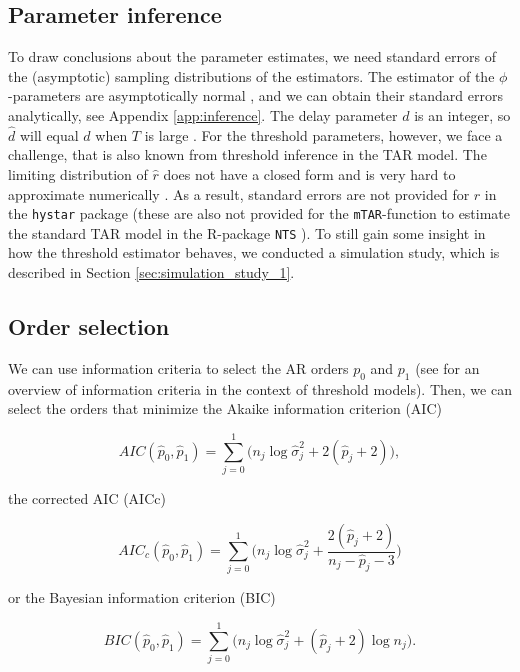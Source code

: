 \documentclass{article}
\begin{document}
\subsection{Parameter inference}
To draw conclusions about the parameter estimates, we need standard errors of the (asymptotic) sampling distributions of the estimators.
The estimator of the $\phi$-parameters are asymptotically normal \citep{bar2}, and we can obtain their standard errors analytically, see Appendix \ref{app:inference}.
The delay parameter $d$ is an integer, so $\hat{d}$ will equal $d$ when $T$ is large \citep{bar2}.
For the threshold parameters, however, we face a challenge, that is also known from threshold inference in the TAR model. 
The limiting distribution of $\hat{r}$ does not have a closed form and is very hard to approximate numerically \citep{bar2, li_least_2012}.
As a result, standard errors are not provided for $\hat{r}$ in the \texttt{hystar} package (these are also not provided for the \texttt{mTAR}-function to estimate the standard TAR model in the \textsf{R}-package \texttt{NTS} \citep{R_NTS}). 
To still gain some insight in how the threshold estimator behaves, we conducted a simulation study, which is described in Section \ref{sec:simulation_study_1}.

\subsection{Order selection}
\label{sec:selecting_AR_orders}
We can use information criteria to select the AR orders $p_0$ and $p_1$ (see \citet{information_criteria_tar} for an overview of information criteria in the context of threshold models). 
Then, we can select the orders that minimize the Akaike information criterion (AIC)

\begin{equation}
AIC(\hat{p}_0, \hat{p}_1) = \sum_{j = 0}^{1} \Big(n_j \log \hat{\sigma}_{j}^2 + 2(\hat{p}_j + 2) \Big),
\end{equation}

the corrected AIC (AICc)

\begin{equation}
AIC_c(\hat{p}_0, \hat{p}_1) = \sum_{j = 0}^{1} \Bigg( n_j \log \hat{\sigma}_{j}^2 + 
\frac{2(\hat{p}_j + 2)}{n_j - \hat{p}_j - 3} \Bigg)
\end{equation}

or the Bayesian information criterion (BIC)

\begin{equation}
BIC(\hat{p}_0, \hat{p}_1) = \sum_{j = 0}^{1} \Big( n_j \log \hat{\sigma}_{j}^2 + (\hat{p}_j + 2)  \log n_j \Big).
\end{equation}
\end{document}
